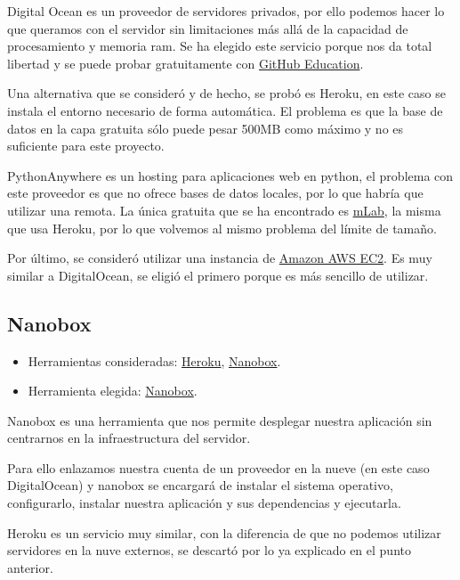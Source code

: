 Digital Ocean \cite{docs:digitalocean} es un proveedor de servidores privados, por ello podemos hacer lo que queramos con el servidor sin limitaciones más allá de la capacidad de procesamiento y memoria ram. Se ha elegido este servicio porque nos da total libertad y se puede probar gratuitamente con \href{https://education.github.com/}{GitHub Education}.

Una alternativa que se consideró y de hecho, se probó es Heroku, en este caso se instala el entorno necesario de forma automática. El problema es que la base de datos en la capa gratuita sólo puede pesar 500MB como máximo y no es suficiente para este proyecto.

PythonAnywhere es un hosting para aplicaciones web en python, el problema con este proveedor es que no ofrece bases de datos locales, por lo que habría que utilizar una remota. La única gratuita que se ha encontrado es \href{https://mlab.com/}{mLab}, la misma que usa Heroku, por lo que volvemos al mismo problema del límite de tamaño.

Por último, se consideró utilizar una instancia de \href{https://aws.amazon.com/es/ec2/}{Amazon AWS EC2}. Es muy similar a DigitalOcean, se eligió el primero porque es más sencillo de utilizar.

\subsection{Nanobox}
\begin{itemize}
	\tightlist
	\item
	Herramientas consideradas:
	\href{https://www.heroku.com/}{Heroku}, 
	\href{https://nanobox.io/}{Nanobox}.
	\item
	Herramienta elegida:
	\href{https://nanobox.io/}{Nanobox}.
\end{itemize}

Nanobox \cite{docs:nanobox} es una herramienta que nos permite desplegar nuestra aplicación sin centrarnos en la infraestructura del servidor.

Para ello enlazamos nuestra cuenta de un proveedor en la nueve (en este caso DigitalOcean) y nanobox se encargará de instalar el sistema operativo, configurarlo, instalar nuestra aplicación y sus dependencias y ejecutarla.

Heroku es un servicio muy similar, con la diferencia de que no podemos utilizar servidores en la nuve externos, se descartó por lo ya explicado en el punto anterior.

